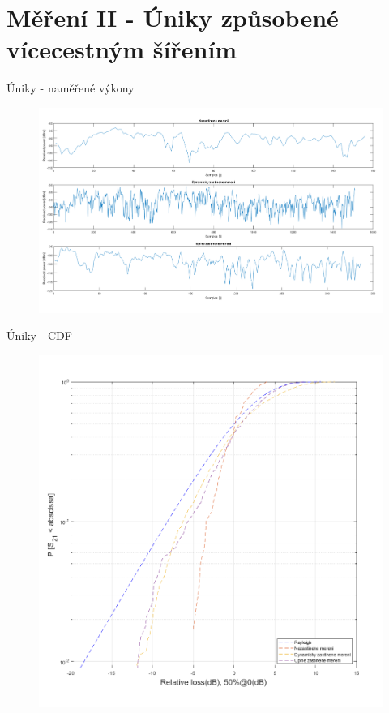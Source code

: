 \documentclass[aspectratio=169, 12pt, hyperref={unicode}]{beamer}
\begin{document}
\section{Měření II - Úniky způsobené vícecestným šířením}
\begin{frame}{Úniky - naměřené výkony}
	\begin{figure}[!ht]
		\centering
		\includegraphics[width=.75\textwidth]{src/uniky-vykon.png}
	\end{figure}
\end{frame}
\begin{frame}{Úniky - CDF}
	\begin{figure}[!ht]
		\centering
		\includegraphics[width=.45\textwidth]{src/uniky-rayleigh.png}
	\end{figure}
\end{frame}
\end{document}
